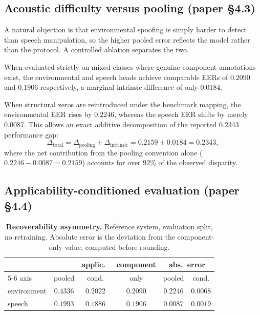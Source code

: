 \documentclass[10pt]{article}
\begin{document}
\subsection*{Acoustic difficulty versus pooling (paper \S4.3)}

A natural objection is that environmental spoofing is simply harder to detect than speech manipulation, so the higher pooled error reflects the model rather than the protocol. A controlled ablation separates the two.

When evaluated strictly on mixed classes where genuine component annotations exist, the environmental and speech heads achieve comparable EERs of $0.2090$ and $0.1906$ respectively, a marginal intrinsic difference of only $0.0184$.

When structural zeros are reintroduced under the benchmark mapping, the environmental EER rises by $0.2246$, whereas the speech EER shifts by merely $0.0087$. This allows an exact additive decomposition of the reported $0.2343$ performance gap:
\begin{equation}
\Delta_{\mathrm{total}} = \Delta_{\mathrm{pooling}} + \Delta_{\mathrm{intrinsic}} = 0.2159 + 0.0184 = 0.2343,
\end{equation}
where the net contribution from the pooling convention alone ($0.2246 - 0.0087 = 0.2159$) accounts for over $92\%$ of the observed disparity.

\subsection*{Applicability-conditioned evaluation (paper \S4.4)}

\setcounter{table}{1}
\begin{table}[h]
\centering
\caption{\textbf{Recoverability asymmetry.} Reference system, evaluation split, no retraining.
Absolute error is the deviation from the component-only value, computed before rounding.}
\label{tab:endtoend}
\setlength{\tabcolsep}{5pt}\small
\begin{tabular}{@{}lccccc@{}}
\toprule
& & applic.\ & component & \multicolumn{2}{c}{abs.\ error} \\
\cmidrule(lr){5-6}
axis & pooled & cond. & only & pooled & cond. \\
\midrule
environment & $0.4336$ & $0.2022$ & $0.2090$ & $0.2246$ & $\mathbf{0.0068}$ \\
speech      & $0.1993$ & $0.1886$ & $0.1906$ & $0.0087$ & $\mathbf{0.0019}$ \\
\bottomrule
\end{tabular}
\end{table}
\end{document}
